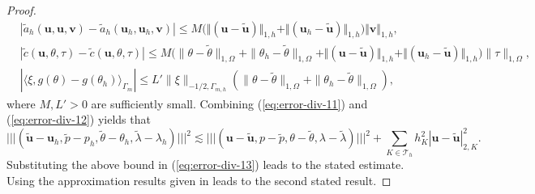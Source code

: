 \documentclass[onefignum,onetabnum,reqno,a4paper,final]{siamart250211}
\newcommand\bu{\boldsymbol{u}}
\newcommand\bv{\boldsymbol{v}}
\newcommand\0{\mathbf{0}}
\def\CT{{\mathcal T}}
\newcommand{\triplenorm}[1]{\lvert\!\lvert\!\lvert #1
  \rvert\!\rvert\!\rvert}
\numberwithin{figure}{section}
\numberwithin{table}{section}
\begin{document}
\begin{proof}
      \begin{subequations}\label{eq:error-div-12}
      \begin{align}
&      |\widetilde{a}_h(\bu,\bu,\bv)-\widetilde{a}_h(\bu_h,\bu_h,\bv)|\le M \big(\Vert(\bu-\tilde{\bu})\Vert_{1,h}+\Vert(\bu_h-\tilde{\bu})\Vert_{1,h}\big)\Vert\bv\Vert_{1,h},\\
&      |\widetilde{c}(\bu,\theta,\tau)-\widetilde{c}(\bu,\theta,\tau)|\le M \big(\|\theta-\tilde{\theta}\|_{1,\Omega}+\|\theta_h-\tilde{\theta}\|_{1,\Omega}+\Vert(\bu-\tilde{\bu})\Vert_{1,h}
      +\Vert(\bu_h-\tilde{\bu})\Vert_{1,h}\big)\|\tau\|_{1,\Omega},\\
   &   |\langle \xi, g(\theta)-g(\theta_h)\rangle_{\Gamma_m}|\le L'\|\xi\|_{-1/2,\Gamma_{m,h}}(\|\theta-\tilde{\theta}\|_{1,\Omega}+\|\theta_h-\tilde{\theta}\|_{1,\Omega}),
      \end{align}          
      \end{subequations}
      where $M,L'>0$ are sufficiently small. 
       Combining (\ref{eq:error-div-11}) and (\ref{eq:error-div-12}) yields that
      $$
       \triplenorm{(\tilde{\bu}-\bu_h,\tilde{p}-p_h,\tilde{\theta}-\theta_h,\tilde{\lambda}-\lambda_h)}^2\lesssim
       \triplenorm{(\bu-\tilde{\bu},p-\tilde{p},\theta-\tilde{\theta},\lambda-\tilde{\lambda})}^2+\sum_{K\in\CT_h}h_K^2|\bu-\tilde{\bu}|_{2,K}^2.
      $$
      Substituting the above bound in (\ref{eq:error-div-13}) leads to the stated estimate. Using the approximation results given in \cite{john2017divergence, kashiwabara2019penalty} leads to the second stated result. 
	\end{proof}

\end{document}
